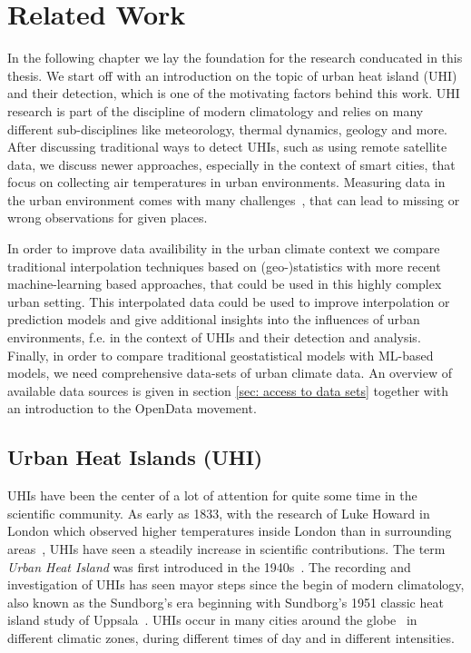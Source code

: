 \chapter{Related Work}
\label{chap:Related Work}

In the following chapter we lay the foundation for the research conducated in this thesis. We start off with an introduction on the topic of urban heat island (UHI) and their detection, which is one of the motivating factors behind this work. UHI research is part of the discipline of modern climatology and relies on many different sub-disciplines like meteorology, thermal dynamics, geology and more.
After discussing traditional ways to detect UHIs, such as using remote satellite data, we discuss newer approaches, especially in the context of smart cities, that focus on collecting air temperatures in urban environments. Measuring data in the urban environment comes with many challenges~\cite{oke2006guideline}, that can lead to missing or wrong observations for given places.

In order to improve data availibility in the urban climate context we compare traditional interpolation techniques based on (geo-)statistics with more recent machine-learning based approaches, that could be used in this highly complex urban setting. This interpolated data could be used to improve interpolation or prediction models and give additional insights into the influences of urban environments, f.e. in the context of UHIs and their detection and analysis.
Finally, in order to compare traditional geostatistical models with ML-based models, we need comprehensive data-sets of urban climate data. An overview of available data sources is given in section \ref{sec: access to data sets} together with an introduction to the OpenData movement.

\section{Urban Heat Islands (UHI)}

UHIs have been the center of a lot of attention for quite some time in the scientific community. As early as 1833, with the research of Luke Howard in London which observed higher temperatures inside London than in surrounding areas~\cite{howard1833climate}, UHIs have seen a steadily increase in scientific contributions. The term \textit{Urban Heat Island} was first introduced in the 1940s~\cite{balchin1947micro}. The recording and investigation of UHIs has seen mayor steps since the begin of modern climatology, also known as the Sundborg's era beginning with Sundborg's 1951 classic heat island study of Uppsala~\cite{sundborg1951climatological}. UHIs occur in many cities around the globe~\cite{peng2012surface} in different climatic zones, during different times of day and in different intensities.\\

